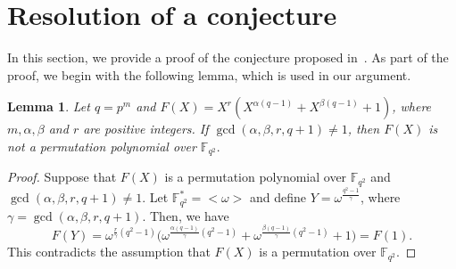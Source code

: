 \documentclass[12pt,reqno]{amsart}
\newtheorem{lem}[thm]{Lemma}
\numberwithin{equation}{section}
\theoremstyle{definition}
\newcommand{\F}{\mathbb F}
\begin{document}
\section{Resolution of a conjecture}{\label{S6}}
In this section, we provide a proof of the conjecture proposed in~\cite{Harsh}. As part of the proof, we begin with the following lemma, which is used in our argument.

\begin{lem}\label{lc1}
Let $q=p^m$ and $F(X)=X^r(X^{\alpha(q-1)}+X^{\beta(q-1)} + 1)$, where $m, \alpha, \beta $ and $r$ are positive integers. If $\gcd(\alpha,\beta,r,q+1) \neq 1$, then $F(X)$ is not a permutation polynomial over $\F_{q^2}.$ 
\end{lem}
\begin{proof}
Suppose that $F(X)$ is a permutation polynomial over $\mathbb{F}_{q^2}$ and $\gcd(\alpha,\beta,r,q+1) \neq 1$. Let $\mathbb{F}_{q^2}^{*}=<\omega>$ and define $Y=\omega^{\frac{q^2-1}{\gamma}}$, where $\gamma=\gcd(\alpha,\beta,r,q+1)$. Then, we have
$$F(Y)=\omega^{\frac{r}{\gamma}(q^2-1)}\Big(\omega^{\frac{\alpha(q-1)}{\gamma}(q^2-1)}+\omega^{\frac{\beta(q-1)}{\gamma}(q^2-1)}+ 1\Big )=F(1).$$
This contradicts the assumption that $F(X)$ is a permutation over $\F_{q^2}$.
\end{proof}
\end{document}
